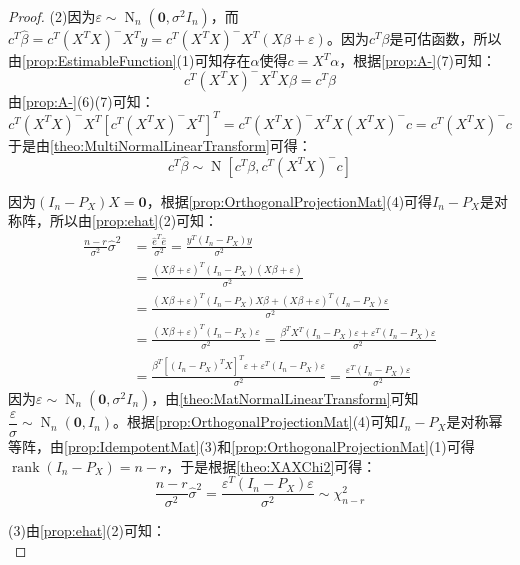 \begin{proof}
	(2)因为$\varepsilon\sim\operatorname{N}_n(\mathbf{0},\sigma^2I_n)$，而$c^T\hat{\beta}=c^T(X^TX)^-X^Ty=c^T(X^TX)^-X^T(X\beta+\varepsilon)$。因为$c^T\beta$是可估函数，所以由\cref{prop:EstimableFunction}(1)可知存在$\alpha$使得$c=X^T\alpha$，根据\cref{prop:A-}(7)可知：
	\begin{equation*}
		c^T(X^TX)^-X^TX\beta=c^T\beta
	\end{equation*}
	由\cref{prop:A-}(6)(7)可知：
	\begin{equation*}
		c^T(X^TX)^-X^T[c^T(X^TX)^-X^T]^T=c^T(X^TX)^-X^TX(X^TX)^-c=c^T(X^TX)^-c
	\end{equation*}
	于是由\cref{theo:MultiNormalLinearTransform}可得：
	\begin{equation*}
		c^T\hat{\beta}\sim\operatorname{N}[c^T\beta,c^T(X^TX)^-c]
	\end{equation*}\par
	因为$(I_n-P_X)X=\mathbf{0}$，根据\cref{prop:OrthogonalProjectionMat}(4)可得$I_n-P_X$是对称阵，所以由\cref{prop:ehat}(2)可知：
	\begin{align*}
		\frac{n-r}{\sigma^2}\hat{\sigma}^2&=\frac{\hat{e}^T\hat{e}}{\sigma^2}=\frac{y^T(I_n-P_X)y}{\sigma^2} \\
		&=\frac{(X\beta+\varepsilon)^T(I_n-P_X)(X\beta+\varepsilon)}{\sigma^2} \\
		&=\frac{(X\beta+\varepsilon)^T(I_n-P_X)X\beta+(X\beta+\varepsilon)^T(I_n-P_X)\varepsilon}{\sigma^2} \\
		&=\frac{(X\beta+\varepsilon)^T(I_n-P_X)\varepsilon}{\sigma^2}=\frac{\beta^TX^T(I_n-P_X)\varepsilon+\varepsilon^T(I_n-P_X)\varepsilon}{\sigma^2} \\
		&=\frac{\beta^T[(I_n-P_X)^TX]^T\varepsilon+\varepsilon^T(I_n-P_X)\varepsilon}{\sigma^2}=\frac{\varepsilon^T(I_n-P_X)\varepsilon}{\sigma^2}
	\end{align*}
	因为$\varepsilon\sim\operatorname{N}_n(\mathbf{0},\sigma^2I_n)$，由\cref{theo:MatNormalLinearTransform}可知$\dfrac{\varepsilon}{\sigma}\sim\operatorname{N}_n(\mathbf{0},I_n)$。根据\cref{prop:OrthogonalProjectionMat}(4)可知$I_n-P_X$是对称幂等阵，由\cref{prop:IdempotentMat}(3)和\cref{prop:OrthogonalProjectionMat}(1)可得$\operatorname{rank}(I_n-P_X)=n-r$，于是根据\cref{theo:XAXChi2}可得：
	\begin{equation*}
		\frac{n-r}{\sigma^2}\hat{\sigma}^2=\frac{\varepsilon^T(I_n-P_X)\varepsilon}{\sigma^2}\sim\chi_{n-r}^2
	\end{equation*}\par
	(3)由\cref{prop:ehat}(2)可知：
	\begin{equation*}

\end{equation*}
\end{proof}
